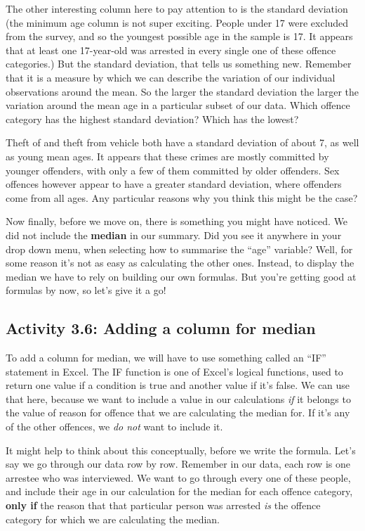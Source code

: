 \documentclass[
]{book}
\begin{document}
The other interesting column here to pay attention to is the standard deviation (the minimum age column is not super exciting. People under 17 were excluded from the survey, and so the youngest possible age in the sample is 17. It appears that at least one 17-year-old was arrested in every single one of these offence categories.) But the standard deviation, that tells us something new. Remember that it is a measure by which we can describe the variation of our individual observations around the mean. So the larger the standard deviation the larger the variation around the mean age in a particular subset of our data. Which offence category has the highest standard deviation? Which has the lowest?

Theft of and theft from vehicle both have a standard deviation of about 7, as well as young mean ages. It appears that these crimes are mostly committed by younger offenders, with only a few of them committed by older offenders. Sex offences however appear to have a greater standard deviation, where offenders come from all ages. Any particular reasons why you think this might be the case?

Now finally, before we move on, there is something you might have noticed. We did not include the \textbf{median} in our summary. Did you see it anywhere in your drop down menu, when selecting how to summarise the ``age'' variable? Well, for some reason it's not as easy as calculating the other ones. Instead, to display the median we have to rely on building our own formulas. But you're getting good at formulas by now, so let's give it a go!

\hypertarget{activity-3.6-adding-a-column-for-median}{%
\subsection{Activity 3.6: Adding a column for median}\label{activity-3.6-adding-a-column-for-median}}

To add a column for median, we will have to use something called an ``IF'' statement in Excel. The IF function is one of Excel's logical functions, used to return one value if a condition is true and another value if it's false. We can use that here, because we want to include a value in our calculations \emph{if} it belongs to the value of reason for offence that we are calculating the median for. If it's any of the other offences, we \emph{do not} want to include it.

It might help to think about this conceptually, before we write the formula. Let's say we go through our data row by row. Remember in our data, each row is one arrestee who was interviewed. We want to go through every one of these people, and include their age in our calculation for the median for each offence category, \textbf{only if} the reason that that particular person was arrested \emph{is} the offence category for which we are calculating the median.
\end{document}
